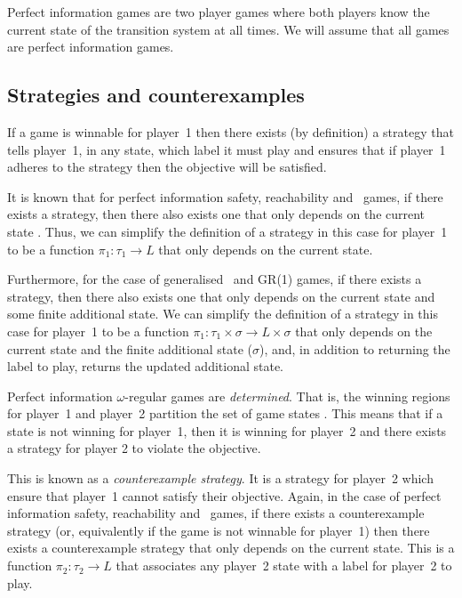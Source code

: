 Perfect information games are two player games where both players know the current state of the transition system at all times. We will assume that all games are perfect information games.

\subsection{Strategies and counterexamples}
\label{sec:strat_and_cex}

If a game is winnable for player~1 then there exists (by definition) a strategy that tells player~1, in any state, which label it must play and ensures that if player~1 adheres to the strategy then the objective will be satisfied.

It is known that for perfect information safety, reachability and \buchi\ games, if there exists a strategy, then there also exists one that only depends on the current state \cite{Gradel}. Thus, we can simplify the definition of a strategy in this case for player~1 to be a function $\pi_1 : \tau_1 \rightarrow L$ that only depends on the current state.

Furthermore, for the case of generalised \buchi\ and GR(1) games, if there exists a strategy, then there also exists one that only depends on the current state and some finite additional state. We can simplify the definition of a strategy in this case for player~1 to be a function $\pi_1 : \tau_1 \times \sigma \rightarrow L \times \sigma$ that only depends on the current state and the finite additional state ($\sigma$), and, in addition to returning the label to play, returns the updated additional state.

Perfect information $\omega$-regular games are \emph{determined}. That is, the winning regions for player~1 and player~2 partition the set of game states \cite{Gradel}. This means that if a state is not winning for player~1, then it is winning for player~2 and there exists a strategy for player 2 to violate the objective.

This is known as a \emph{counterexample strategy}. It is a strategy for player~2 which ensure that player~1 cannot satisfy their objective. Again, in the case of perfect information safety, reachability and \buchi\ games, if there exists a counterexample strategy (or, equivalently if the game is not winnable for player~1) then there exists a counterexample strategy that only depends on the current state. This is a function $\pi_2 : \tau_2 \rightarrow L$ that associates any player~2 state with a label for player~2 to play. 

